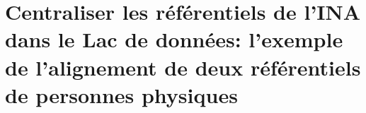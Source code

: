 \chapter{\label{III-C}Centraliser les référentiels de l’INA dans le Lac de données: l'exemple de l'alignement de deux référentiels de personnes physiques}


